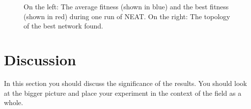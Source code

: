 \documentclass[11pt]{article}
\begin{document}
\begin{figure}[h]
\begin{center}
\end{center}
\caption{On the left: The average fitness (shown in blue) and the best
  fitness (shown in red) during one run of NEAT. On the right: The
  topology of the best network found.}
\label{fitness}
\end{figure}

\section{Discussion}

In this section you should discuss the significance of the results.
You should look at the bigger picture and place your experiment in the
context of the field as a whole.  



\end{document}
